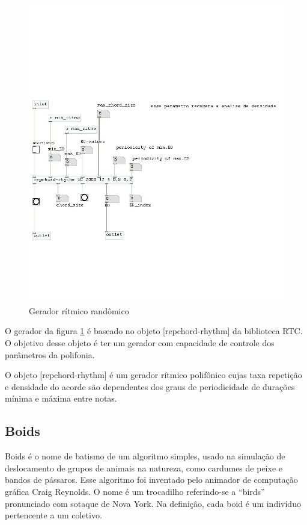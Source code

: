 \documentclass{ppgmus}
\begin{document}
\begin{figure}
\includegraphics[scale=.6]{gerador-ritmico3}
\caption{Gerador rítmico randômico}
\label{gera-ritmico3}
\end{figure}  

O gerador da figura \ref{gera-ritmico3} é baseado no 
objeto [repchord-rhythm] da biblioteca RTC. O objetivo desse objeto é 
ter um gerador com capacidade de controle dos parâmetros da polifonia.

O objeto [repchord-rhythm] é um gerador rítmico polifônico cujas taxa repetição
e densidade do acorde são dependentes dos graus de periodicidade de durações
mínima e máxima entre notas. 

\subsection{Boids}

Boids é o nome de batismo de um algoritmo simples, usado na simulação de deslocamento
de grupos de animais na natureza, como cardumes de peixe e bandos de pássaros.
Esse algoritmo foi inventado pelo animador de computação gráfica Craig Reynolds.
O nome é um trocadilho referindo-se a ``birds'' pronunciado com sotaque de Nova York.
Na definição, cada boid é um indivíduo pertencente a um coletivo.
\end{document}
